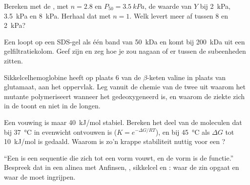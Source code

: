 \begin{exercise}[$\star\star$]\label{exo:b1:proteins:8}
Bereken met de , met $n = 2.8$ en $P_{50} = \qty{3.5}{kPa}$, de
waarde van $Y$ bij \qty{2}{kPa}, \qty{3.5}{kPa} en \qty{8}{kPa}. Herhaal dat met
$n = 1$. Welk  levert meer af tussen \qty{8}{} en \qty{2}{kPa}?
\end{exercise}

\begin{exercise}[$\star\star$]\label{exo:b1:proteins:9}
Een  loopt op een SDS-gel als één band van \qty{50}{kDa} en komt bij
\qty{200}{kDa} uit een gelfiltratiekolom. Geef zijn  en zeg
hoe je zou nagaan of er  tussen de subeenheden zitten.
\end{exercise}

\begin{exercise}[$\star\star\star$]\label{exo:b1:proteins:10}
Sikkelcelhemoglobine heeft op plaats 6 van de $\beta$-keten valine in plaats van
glutamaat, aan het oppervlak. Leg vanuit de chemie van de twee  uit
waarom het mutante  polymeriseert wanneer het gedeoxygeneerd is, en waarom de
ziekte zich in de  toont en niet in de longen.
\end{exercise}

\begin{exercise}[$\star\star\star$]\label{exo:b1:proteins:11}
Een vouwing is maar \qty{40}{kJ/mol} stabiel. Bereken het deel van de moleculen
dat bij \qty{37}{\celsius} in evenwicht ontvouwen is ($K = e^{-\Delta G/RT}$), en
bij \qty{45}{\celsius} als $\Delta G$ tot \qty{10}{kJ/mol} is gedaald. Waarom is
zo'n krappe stabiliteit nuttig voor een ?
\end{exercise}

\begin{exercise}[$\star\star\star$]\label{exo:b1:proteins:12}
``Een  is een sequentie die zich tot een vorm vouwt, en de vorm is de
functie.'' Bespreek dat in een alinea met Anfinsen, , sikkelcel en
: waar de zin opgaat en waar de  moet ingrijpen.
\end{exercise}


